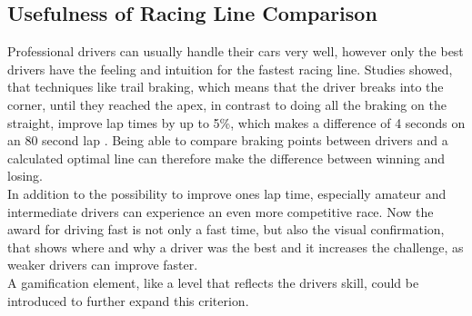 \subsection{Usefulness of Racing Line Comparison}
Professional drivers can usually handle their cars very well, however only the best drivers have the feeling and intuition for the fastest racing line. Studies showed, that techniques like trail braking, which means that the driver breaks into the corner, until they reached the apex, in contrast to doing all the braking on the straight, improve lap times by up to 5\%, which makes a difference of 4 seconds on an 80 second lap \cite{gustafsson08}. Being able to compare braking points between drivers and a calculated optimal line can therefore make the difference between winning and losing.\\
In addition to the possibility to improve ones lap time, especially amateur and intermediate drivers can experience an even more competitive race. Now the award for driving fast is not only a fast time, but also the visual confirmation, that shows where and why a driver was the best and it increases the challenge, as weaker drivers can improve faster.\\
A gamification element, like a level that reflects the drivers skill, could be introduced to further expand this criterion.

\clearpage
